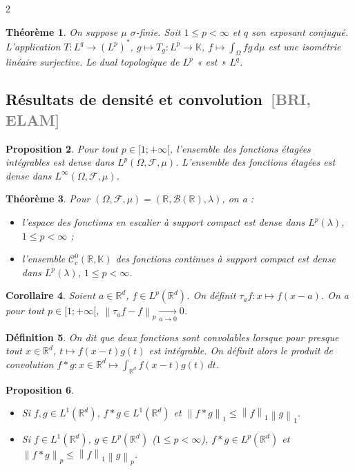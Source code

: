 \documentclass[10pt,a4paper]{article}
\theoremstyle{plan}
\newtheorem{theoreme}{Théorème}
\newtheorem{definition}[theoreme]{Définition}
\newtheorem{proposition}[theoreme]{Proposition}
\newtheorem{corollaire}[theoreme]{Corollaire}
\theoremstyle{planex}   %
\newcommand{\srcs}[1]{\ {\normalfont\small\textcolor{gray}{[#1]}}}
\newcommand{\R}{\mathbb{R}}
\newcommand{\K}{\mathbb{K}}
\newcommand{\Cc}{\mathcal{C}}
\newcommand{\Bb}{\mathcal{B}}
\newcommand{\norm}[1]{\left\lVert #1\right\rVert}
\begin{document}
\begin{multicols}{2}
\begin{theoreme}
On suppose $\mu$ $\sigma$-finie. Soit $1 \le p < \infty$ et $q$ son exposant conjugué. L'application $T : L^q \to (L^p)^*$, $g \mapsto T_g : L^p \to \K$, $f \mapsto \int_\Omega fg\,d\mu$ est une isométrie linéaire surjective. Le dual topologique de $L^p$ « est » $L^q$.
\end{theoreme}

\subsection{Résultats de densité et convolution\srcs{BRI, ELAM}}

\begin{proposition}
Pour tout $p \in [1;+\infty[$, l'ensemble des fonctions étagées intégrables est dense dans $L^p(\Omega,\mathcal{F},\mu)$. L'ensemble des fonctions étagées est dense dans $L^\infty(\Omega,\mathcal{F},\mu)$.
\end{proposition}

\begin{theoreme}
Pour $(\Omega,\mathcal{F},\mu) = (\R, \Bb(\R), \lambda)$, on a :
\begin{itemize}
\item l'espace des fonctions en escalier à support compact est dense dans $L^p(\lambda)$, $1 \le p < \infty$ ;
\item l'ensemble $\Cc^0_c(\R,\K)$ des fonctions continues à support compact est dense dans $L^p(\lambda)$, $1 \le p < \infty$.
\end{itemize}
\end{theoreme}

\begin{corollaire}
Soient $a \in \R^d$, $f \in L^p(\R^d)$. On définit $\tau_a f : x \mapsto f(x-a)$. On a pour tout $p \in [1;+\infty[$, $\norm{\tau_a f - f}_p \xrightarrow[a \to 0]{} 0$.
\end{corollaire}

\begin{definition}
On dit que deux fonctions sont convolables lorsque pour presque tout $x \in \R^d$, $t \mapsto f(x-t) g(t)$ est intégrable. On définit alors le produit de convolution $f * g : x \in \R^d \mapsto \int_{\R^d} f(x-t) g(t)\,dt$.
\end{definition}

\begin{proposition}
\begin{itemize}
\item Si $f, g \in L^1(\R^d)$, $f * g \in L^1(\R^d)$ et $\norm{f * g}_1 \le \norm{f}_1 \norm{g}_1$.
\item Si $f \in L^1(\R^d)$, $g \in L^p(\R^d)$ ($1 \le p < \infty$), $f * g \in L^p(\R^d)$ et $\norm{f * g}_p \le \norm{f}_1 \norm{g}_p$.
\end{itemize}
\end{proposition}


\end{multicols}
\end{document}
